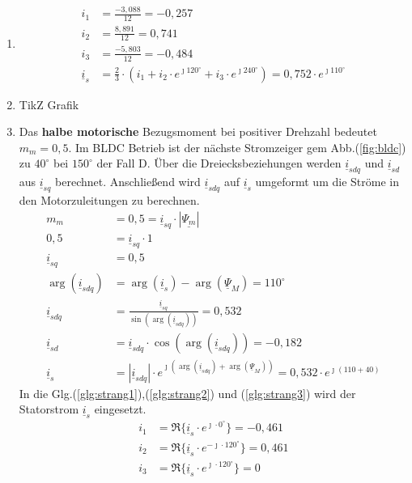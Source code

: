 \begin{solution}
\begin{enumerate}
\item
\begin{align}
i_1 &= \frac{-3,088}{12} = -0,257\\
i_2 &= \frac{8,891}{12} = 0,741\\
i_3 &= \frac{-5,803}{12} = -0,484\\
\underline{i}_s &= \frac{2}{3} \cdot ( i_1 + i_2 \cdot e^{\jmath 120 ^\circ} + i_3 \cdot e^{\jmath 240 ^\circ}) = 0,752 \cdot e^{\jmath 110^\circ}
\end{align}
\item TikZ Grafik
\item Das \textbf{halbe motorische} Bezugsmoment bei positiver Drehzahl bedeutet $m_m = 0,5$. Im BLDC Betrieb ist der n\"achste Stromzeiger gem Abb.(\ref{fig:bldc}) zu $40^\circ$ bei $150^\circ$ der Fall D. \"Uber die Dreiecksbeziehungen werden $\underline{i}_{sdq}$ und $\underline{i}_{sd}$ aus $\underline{i}_{sq}$ berechnet. Anschließend wird $\underline{i}_{sdq}$ auf $\underline{i}_{s}$ umgeformt um die Str\"ome in den Motorzuleitungen zu berechnen.
\begin{align}
m_m &= 0,5 = \underline{i}_{sq} \cdot |\underline{\Psi_m}|\\
0,5&= \underline{i}_{sq} \cdot 1\\
\underline{i}_{sq} &= 0,5\\
\arg(\underline{i}_{sdq}) &= \arg(\underline{i}_{s}) -\arg(\underline{\Psi}_{M})=110^\circ\\
\underline{i}_{sdq} &= \frac{\underline{i}_{sq}}{\sin(\arg(\underline{i}_{sdq}))}= 0,532\\
\underline{i}_{sd} &= \underline{i}_{sdq} \cdot \cos(\arg(\underline{i}_{sdq})) = -0,182\\
\underline{i}_{s} &= |\underline{i}_{sdq}| \cdot e^{\jmath (\arg(\underline{i}_{sdq}) + \arg(\underline{\Psi}_{M}))}= 0,532 \cdot e^{\jmath ( 110 + 40)}
\end{align}
In die Glg.(\ref{glg:strang1}),(\ref{glg:strang2}) und (\ref{glg:strang3}) wird der Statorstrom $\underline{i}_s$ eingesetzt.
\begin{align}
i_1 & = \Re \{ \underline{i}_s \cdot e^{\jmath \cdot 0 ^\circ} \} = -0,461\\
i_2 & = \Re \{ \underline{i}_s \cdot e^{-\jmath \cdot 120 ^\circ} \} = 0,461 \\
i_3 & = \Re \{ \underline{i}_s \cdot e^{\jmath \cdot 120 ^\circ} \}=  0
\end{align}

\end{enumerate}
\end{solution}
